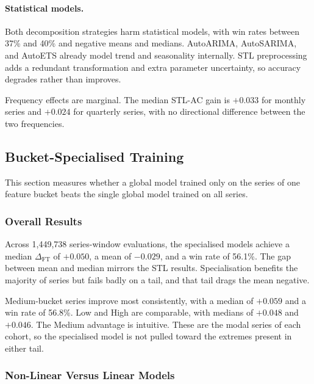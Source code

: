 \documentclass[pdflatex,sn-mathphys-num]{sn-jnl}
\theoremstyle{thmstyleone}
\theoremstyle{thmstyletwo}
\theoremstyle{thmstylethree}
\begin{document}
\paragraph{Statistical models.}
Both decomposition strategies harm statistical models, with win rates between
37\% and 40\% and negative means and medians. AutoARIMA, AutoSARIMA, and
AutoETS already model trend and seasonality internally. STL preprocessing adds
a redundant transformation and extra parameter uncertainty, so accuracy
degrades rather than improves.

Frequency effects are marginal. The median STL-AC gain is $+0.033$ for monthly
series and $+0.024$ for quarterly series, with no directional difference
between the two frequencies.

\subsection{Bucket-Specialised Training}\label{sec:ft_results}

This section measures whether a global model trained only on the series of one
feature bucket beats the single global model trained on all series.

\subsubsection{Overall Results}\label{sec:ft_overall}

Across 1{,}449{,}738 series-window evaluations, the specialised models achieve
a median $\Delta_{\mathrm{FT}}$ of $+0.050$, a mean of $-0.029$, and a win
rate of 56.1\%. The gap between mean and median mirrors the STL results.
Specialisation benefits the majority of series but fails badly on a tail, and
that tail drags the mean negative.

Medium-bucket series improve most consistently, with a median of $+0.059$ and
a win rate of 56.8\%. Low and High are comparable, with medians of $+0.048$
and $+0.046$. The Medium advantage is intuitive. These are the modal series of
each cohort, so the specialised model is not pulled toward the extremes
present in either tail.

\subsubsection{Non-Linear Versus Linear Models}\label{sec:linvnonlin}
\end{document}
